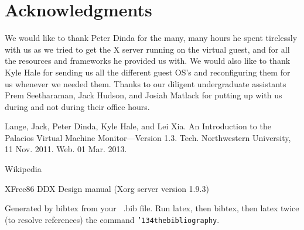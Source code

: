 \documentclass{acm_proc_article-sp}
\begin{document}
\section{Acknowledgments}
We would like to thank Peter Dinda for the many, many hours he spent tirelessly with us as we
tried to get the X server running on the virtual guest, and for all the
resources and frameworks he provided us with. We would also like to thank Kyle
Hale for sending us all the different guest OS's and reconfiguring them for us
whenever we needed them. Thanks to our diligent undergraduate assistants Prem
Seetharaman, Jack Hudson, and Josiah Matlack for putting up with us during and
not during their office hours.
%
%
%
\begin{thebibliography}{1}

   Lange, Jack, Peter Dinda, Kyle Hale, and Lei Xia. An Introduction to the Palacios Virtual Machine Monitor---Version 1.3. Tech. Northwestern University, 11 Nov. 2011. Web. 01 Mar. 2013.

   Wikipedia 

  XFree86 DDX Design manual (Xorg server version 1.9.3) 

  \end{thebibliography}
Generated by bibtex from your ~.bib file.  Run latex,
then bibtex, then latex twice (to resolve references)
the command \texttt{{\char'134}thebibliography}.
\balancecolumns
\end{document}
